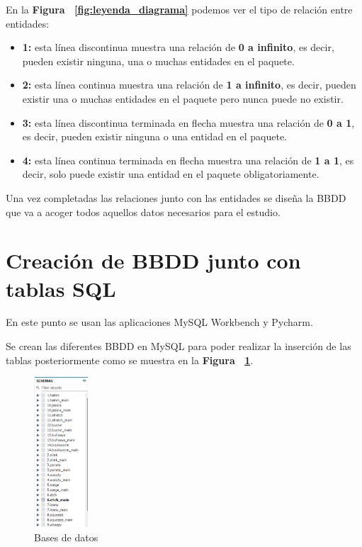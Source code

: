 \documentclass[a4paper, 12pt]{book}
\begin{document}
En la \textbf {Figura ~\ref{fig:leyenda_diagrama}} podemos ver el tipo de relación entre entidades:

\begin{itemize}
\item \textbf {1: }esta línea discontinua muestra una relación de \textbf {0 a infinito}, es decir, pueden existir ninguna, una o muchas entidades en el paquete.
\item \textbf {2: }esta línea continua muestra una relación de \textbf {1 a infinito}, es decir, pueden existir una o muchas entidades en el paquete pero nunca puede no existir.
\item \textbf {3: }esta línea discontinua terminada en flecha muestra una relación de \textbf {0 a 1}, es decir, pueden existir ninguna o una entidad en el paquete.
\item \textbf {4: }esta línea continua terminada en flecha muestra una relación de \textbf {1 a 1}, es decir, solo puede existir una entidad en el paquete obligatoriamente.
\end{itemize}

Una vez completadas las relaciones junto con las entidades se diseña la BBDD que va a acoger todos aquellos datos necesarios para el estudio.

\section{Creación de BBDD junto con tablas SQL} 
\label{sec:creacion_BBDD}
En este punto se usan las aplicaciones MySQL Workbench y Pycharm.

Se crean las diferentes BBDD en MySQL para poder realizar la inserción de las tablas posteriormente como se muestra en la \textbf {Figura ~\ref{fig:BBDDsql}}.

\begin{figure}[h]
	\centering
	\includegraphics[width=2cm, keepaspectratio]{img/BBDDsql.png}
	\caption{Bases de datos}
	\label{fig:BBDDsql}
\end{figure}
\end{document}
